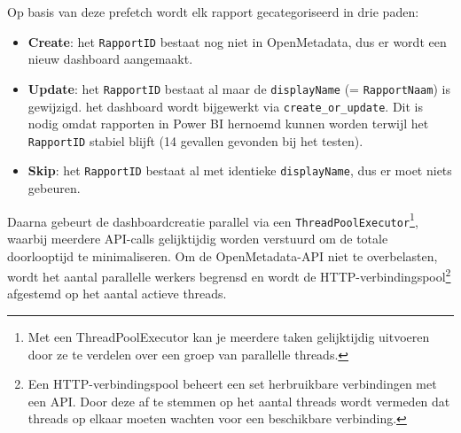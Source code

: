 Op basis van deze prefetch wordt elk rapport gecategoriseerd in drie paden:
\begin{itemize}
	\item \textbf{Create}: het \texttt{RapportID} bestaat nog niet in OpenMetadata, dus er wordt een nieuw dashboard aangemaakt.
	\item \textbf{Update}: het \texttt{RapportID} bestaat al maar de \texttt{displayName} (= \texttt{RapportNaam}) is gewijzigd. het dashboard wordt bijgewerkt via \texttt{create\_or\_update}. Dit is nodig omdat rapporten in Power BI hernoemd kunnen worden terwijl het \texttt{RapportID} stabiel blijft (14 gevallen gevonden bij het testen).
	\item \textbf{Skip}: het \texttt{RapportID} bestaat al met identieke \texttt{displayName}, dus er moet niets gebeuren.
\end{itemize}

Daarna gebeurt de dashboardcreatie parallel via een \texttt{ThreadPoolExecutor}\footnote{Met een ThreadPoolExecutor kan je  meerdere taken gelijktijdig uitvoeren door ze te verdelen over een groep van parallelle threads.}, waarbij meerdere API-calls gelijktijdig worden verstuurd om de totale doorlooptijd te minimaliseren. Om de OpenMetadata-API niet te overbelasten, wordt het aantal parallelle werkers begrensd en wordt de HTTP-verbindingspool\footnote{Een HTTP-verbindingspool beheert een set herbruikbare verbindingen met een API. Door deze af te stemmen op het aantal threads wordt vermeden dat threads op elkaar moeten wachten voor een beschikbare verbinding.} afgestemd op het aantal actieve threads.\\

